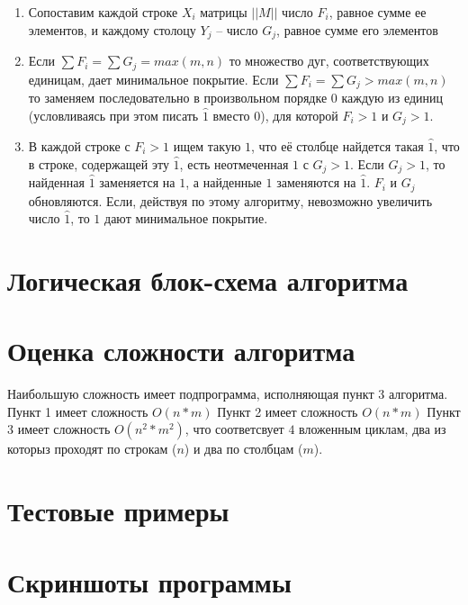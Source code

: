 \documentclass[12pt]{article}
\begin{document}
\begin{enumerate}
    \item Сопоставим каждой строке $X_i$ матрицы $||M||$
          число $F_i$, равное сумме ее элементов,
          и каждому столоцу $Y_j$ – число $G_j$, равное сумме
          его элементов
    \item Если $\sum F_i = \sum G_j = max(m, n)$ то
          множество дуг, соответствующих единицам,
          дает минимальное покрытие. Если
          $\sum F_i = \sum G_j > max(m, n)$
          то заменяем последовательно
          в произвольном порядке $0$ каждую из единиц
          (условливаясь при этом писать $\widehat{1}$ вместо $0$),
          для которой $F_i > 1$ и $G_j > 1$.
    \item В каждой строке с $F_i > 1$ ищем такую
          $1$, что её столбце найдется
          такая $\widehat{1}$, что в строке,
          содержащей эту $\widehat{1}$, есть неотмеченная $1$
          с $G_j > 1$. Если $G_j > 1$, то найденная $\widehat{1}$
          заменяется на $1$, а найденные $1$ заменяются на
          $\widehat{1}$. $F_i$ и $G_j$ обновляются.
          Если, действуя по этому алгоритму,
          невозможно увеличить число $\widehat{1}$,
          то $1$ дают минимальное покрытие.
\end{enumerate}

\section{Логическая блок-схема алгоритма}

\section{Оценка сложности алгоритма}

Наибольшую сложность имеет подпрограмма, исполняющая
пункт 3 алгоритма. Пункт 1 имеет сложность $O(n * m)$
Пункт 2 имеет сложность $O(n * m)$
Пункт 3 имеет сложность $O(n^2 * m^2)$, что соответсвует $4$
вложенным циклам, два из которыз проходят по строкам ($n$) и
два по столбцам ($m$).

\section{Тестовые примеры}

\section{Скриншоты программы}
\end{document}
